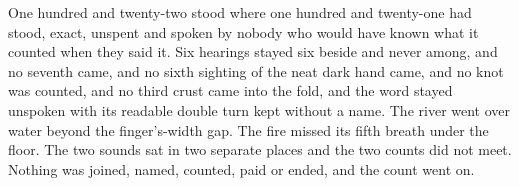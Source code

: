 One hundred and twenty-two stood where one hundred and twenty-one had stood, exact, unspent and spoken by nobody who would have known what it counted when they said it. Six hearings stayed six beside and never among, and no seventh came, and no sixth sighting of the neat dark hand came, and no knot was counted, and no third crust came into the fold, and the word stayed unspoken with its readable double turn kept without a name. The river went over water beyond the finger's-width gap. The fire missed its fifth breath under the floor. The two sounds sat in two separate places and the two counts did not meet. Nothing was joined, named, counted, paid or ended, and the count went on.
